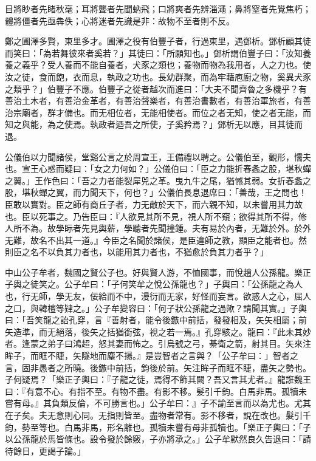 \begin{pinyinscope}
目將眇者先睹秋毫；耳將聾者先聞蚋飛；口將爽者先辨淄澠；鼻將窒者先覺焦朽；體將僵者先亟犇佚；心將迷者先識是非：故物不至者則不反。

鄭之圃澤多賢，東里多才。圃澤之役有伯豐子者，行過東里，遇鄧析。鄧析顧其徒而笑曰：「為若舞彼來者奚若？」其徒曰：「所願知也。」鄧析謂伯豐子曰：「汝知養養之義乎？受人養而不能自養者，犬豕之類也；養物而物為我用者，人之力也。使汝之徒，食而飽，衣而息，執政之功也。長幼群聚，而為牢藉庖廚之物，奚異犬豕之類乎？」伯豐子不應。伯豐子之從者越次而進曰：「大夫不聞齊魯之多機乎？有善治土木者，有善治金革者，有善治聲樂者，有善治書數者，有善治軍旅者，有善治宗廟者，群才備也。而无相位者，无能相使者。而位之者无知，使之者无能，而知之與能，為之使焉。執政者迺吾之所使，子奚矜焉？」鄧析无以應，目其徒而退。

公儀伯以力聞諸侯，堂谿公言之於周宣王，王備禮以聘之。公儀伯至，觀形，懦夫也。宣王心惑而疑曰：「女之力何如？」公儀伯曰：「臣之力能折春螽之股，堪秋蟬之翼。」王作色曰：「吾之力者能裂犀兕之革。曳九牛之尾，猶憾其弱。女折春螽之股，堪秋蟬之翼，而力聞天下，何也？」公儀伯長息退席曰：「善哉，王之問也！臣敢以實對。臣之師有商丘子者，力无敵於天下，而六親不知，以未嘗用其力故也。臣以死事之。乃告臣曰：『人欲見其所不見，視人所不窺；欲得其所不得，修人所不為。故學眎者先見輿薪，學聽者先聞撞鍾。夫有易於內者，无難於外。於外无難，故名不出其一道。』今臣之名聞於諸侯，是臣違師之教，顯臣之能者也。然則臣之名不以負其力者也，以能用其力者也，不猶愈於負其力者乎？」

中山公子牟者，魏國之賢公子也。好與賢人游，不恤國事，而悅趙人公孫龍。樂正子輿之徒笑之。公子牟曰：「子何笑牟之悅公孫龍也？」子輿曰：「公孫龍之為人也，行无師，學无友，佞給而不中，漫衍而无家，好怪而妄言。欲惑人之心，屈人之口，與韓檀等肄之。」公子牟變容曰：「何子狀公孫龍之過歟？請聞其實。」子輿曰：「吾笑龍之詒孔穿，言『善射者，能令後鏃中前括，發發相及，矢矢相屬；前矢造準，而无絕落，後矢之括猶銜弦，視之若一焉。』孔穿駭之。龍曰：『此未其妙者。逢蒙之弟子曰鴻超，怒其妻而怖之。引烏號之弓，綦衛之箭，射其目。矢來注眸子，而眶不睫，矢隧地而塵不揚。』是豈智者之言與？「公子牟曰：」智者之言，固非愚者之所曉。後鏃中前括，鈞後於前。矢注眸子而眶不睫，盡矢之勢也。子何疑焉？「樂正子輿曰：『子龍之徒，焉得不飾其闕？吾又言其尤者。』龍誑魏王曰：『有意不心。有指不至。有物不盡。有影不移。髮引千鈞。白馬非馬。孤犢未嘗有母。』其負類反倫，不可勝言也。」公子牟曰：』子不諭至言而以為尤也。尤其在子矣。夫无意則心同。无指則皆至。盡物者常有。影不移者，說在改也。髮引千鈞，勢至等也。白馬非馬，形名離也。孤犢未嘗有母非孤犢也。「樂正子輿曰：「子以公孫龍於馬皆條也。設令發於餘竅，子亦將承之。」公子牟默然良久告退曰：「請待餘日，更謁子論。」


\end{pinyinscope}
